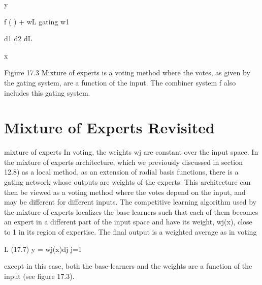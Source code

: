 y

f ( ) + wL gating w1

d1 d2 dL

x

Figure 17.3 Mixture of experts is a voting method where the votes, as given by the gating system, are a function of the input. The combiner system f also includes this gating system.

\section{Mixture of Experts Revisited}

mixture of experts In voting, the weights wj are constant over the input space. In the mixture of experts architecture, which we previously discussed in section 12.8) as a local method, as an extension of radial basis functions, there is a gating network whose outputs are weights of the experts. This architecture can then be viewed as a voting method where the votes depend on the input, and may be different for different inputs. The competitive learning algorithm used by the mixture of experts localizes the base-learners such that each of them becomes an expert in a different part of the input space and have its weight, wj(x), close to 1 in its region of expertise. The final output is a weighted average as in voting

L (17.7) y = wj(x)dj j=1

except in this case, both the base-learners and the weights are a function of the input (see figure 17.3).

